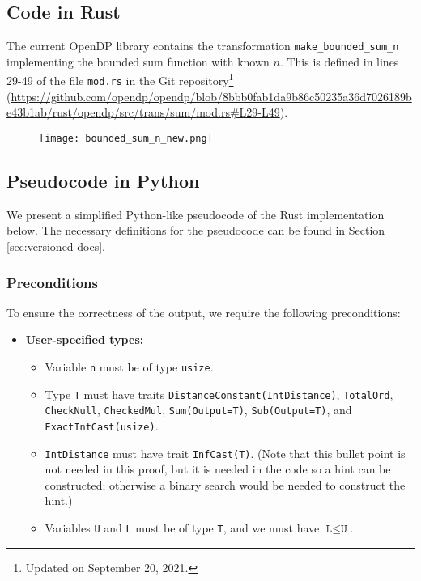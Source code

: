 \documentclass[11pt,a4paper]{article}
\theoremstyle{definition}
\begin{document}
\subsection{Code in Rust}
The current OpenDP library contains the transformation \texttt{make\_bounded\_sum\_n} implementing the bounded sum function with known $n$. This is defined in lines 29-49 of the file \texttt{mod.rs} in the Git repository\footnote{Updated on September 20, 2021.} (\url{https://github.com/opendp/opendp/blob/8bbb0fab1da9b86c50235a36d7026189be43b1ab/rust/opendp/src/trans/sum/mod.rs#L29-L49}).


\begin{figure}[ht]
    \texttt{[image: bounded\_sum\_n\_new.png]}
    \centering
    \label{fig:code}
\end{figure}

\subsection{Pseudocode in Python}
\label{sec:pseudocode}
We present a simplified Python-like pseudocode of the Rust implementation below. The necessary definitions for the pseudocode can be found in Section \ref{sec:versioned-docs}.

\subsubsection*{Preconditions}
To ensure the correctness of the output, we require the following preconditions:

\begin{itemize}
    \item \textbf{User-specified types:}
    \begin{itemize}
        \item Variable \texttt{n} must be of type \texttt{usize}.
        \item Type \texttt{T} must have traits \texttt{DistanceConstant(IntDistance)}, \texttt{TotalOrd}, \texttt{CheckNull}, \texttt{CheckedMul},  \texttt{Sum(Output=T)}, \texttt{Sub(Output=T)},  and \texttt{ExactIntCast(usize)}.
        \item \texttt{IntDistance} must have trait \texttt{InfCast(T)}. (Note that this bullet point is not needed in this proof, but it is needed in the code so a hint can be constructed; otherwise a binary search would be needed to construct the hint.)
        \item Variables \texttt{U} and \texttt{L} must be of type \texttt{T}, and we must have $\texttt{L} \leq \texttt{U}$.

\end{itemize}
\end{itemize}
\end{document}
